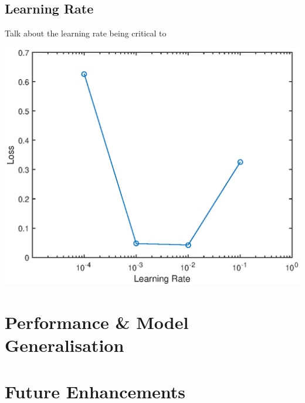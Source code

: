 \documentclass[a4paper]{article}
\begin{document}
\subsection{Learning Rate}
\begin{minipage}{0.45\textwidth}
Talk about the learning rate being critical to 
\end{minipage}
\hspace{1cm}
\begin{minipage}{0.45\textwidth}
\centering
\includegraphics[scale=0.5]{hyp_par_3}
\end{minipage}


\section{Performance \& Model Generalisation}

\section{Future Enhancements}
\end{document}

